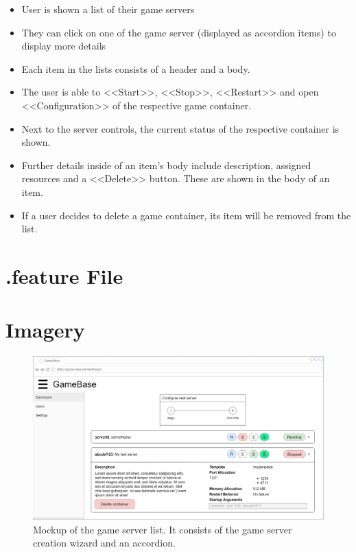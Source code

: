 \documentclass[a4paper,12pt,chapterprefix=false,bibliography=totoc,listof=totoc,book]{scrreprt}
\begin{document}
    \begin{itemize}
        \item User is shown a list of their game servers
        \item They can click on one of the game server (displayed as accordion items) to display more details
        \item Each item in the lists consists of a header and a body.
        \item The user is able to <<Start>>, <<Stop>>, <<Restart>> and open <<Configuration>> of the respective game container.
        \item Next to the server controls, the current status of the respective container is shown.
        \item Further details inside of an item's body include description, assigned resources and a <<Delete>> button. These are shown in the body of an item.
        \item If a user decides to delete a game container, its item will be removed from the list.
    \end{itemize}

    \section{.feature File}
    \begin{minipage}{\textwidth}
    
    \end{minipage}

    \section{Imagery}
    \begin{figure}
        \includegraphics[width=\textwidth]{diagramms/UCShowGameServerListMockup.png}
        \caption{Mockup of the game server list. It consists of the game server creation wizard and an accordion.}
        \label{fig:mockup}
    \end{figure}
\end{document}

